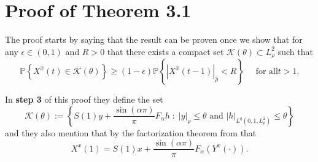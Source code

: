 \documentclass{article}
\numberwithin{equation}{section}
\begin{document}
\section{Proof of Theorem 3.1 \cite{TZ98}} 
The proof starts by saying that the result can be proven once we show that for any $\epsilon \in (0,1)$ and $R>0$ that there exists a compact set $\mathscr{K}(\theta) \subset L^2_{\rho}$ such that 
	\begin{equation}\label{E:3.1ineq}
		\mathbb{P}\left\{ X^{\hat x}(t) \in \mathscr{K}(\theta) \right\} \ge (1-\epsilon)\mathbb{P} \left\{ | X^{\hat x}(t-1)|_{\hat \rho} < R \right\} \quad \text{ for all} t>1.
	\end{equation}

In \textbf{step 3} of this proof they define the set 
	\begin{equation}\label{E:KTheta}
		\mathscr{K}(\theta) := \left\{ S(1)y + \frac{\sin(\alpha \pi)}{\pi} F_{\alpha}h  \; : \; |y|_{\hat{\rho}} \le \theta \text{ and } |h|_{L^q(0,1,L^2_{\rho})} \le \theta\right\}
	\end{equation}
and they also mention that by the factorization theorem from \cite{DZ96} that 
	\begin{equation}\label{E:Factorization}
		X^x(1) = S(1)x + \frac{\sin(\alpha \pi)}{\pi} F_{\alpha}\left( Y^x(\cdot) \right).
	\end{equation}
		
\end{document}
